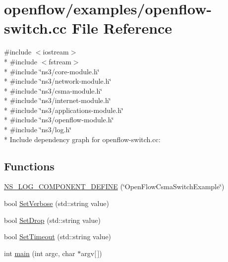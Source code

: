 \hypertarget{openflow-switch_8cc}{}\section{openflow/examples/openflow-\/switch.cc File Reference}
\label{openflow-switch_8cc}
{\ttfamily \#include $<$iostream$>$}\\*
{\ttfamily \#include $<$fstream$>$}\\*
{\ttfamily \#include \char`\"{}ns3/core-\/module.\+h\char`\"{}}\\*
{\ttfamily \#include \char`\"{}ns3/network-\/module.\+h\char`\"{}}\\*
{\ttfamily \#include \char`\"{}ns3/csma-\/module.\+h\char`\"{}}\\*
{\ttfamily \#include \char`\"{}ns3/internet-\/module.\+h\char`\"{}}\\*
{\ttfamily \#include \char`\"{}ns3/applications-\/module.\+h\char`\"{}}\\*
{\ttfamily \#include \char`\"{}ns3/openflow-\/module.\+h\char`\"{}}\\*
{\ttfamily \#include \char`\"{}ns3/log.\+h\char`\"{}}\\*
Include dependency graph for openflow-\/switch.cc\+:
\subsection*{Functions}
\begin{DoxyCompactItemize}
\item 
\hyperlink{openflow-switch_8cc_aa571fd29120b9088cf218d1432d3aa63}{N\+S\+\_\+\+L\+O\+G\+\_\+\+C\+O\+M\+P\+O\+N\+E\+N\+T\+\_\+\+D\+E\+F\+I\+NE} (\char`\"{}Open\+Flow\+Csma\+Switch\+Example\char`\"{})
\item 
bool \hyperlink{openflow-switch_8cc_aabb01f1253262daf5b9d12bcf26eafa7}{Set\+Verbose} (std\+::string value)
\item 
bool \hyperlink{openflow-switch_8cc_a39c23c06091b2372b665c9bafd7992a3}{Set\+Drop} (std\+::string value)
\item 
bool \hyperlink{openflow-switch_8cc_a8a605e661c7465f5be2e79bbce12032d}{Set\+Timeout} (std\+::string value)
\item 
int \hyperlink{openflow-switch_8cc_a0ddf1224851353fc92bfbff6f499fa97}{main} (int argc, char $\ast$argv\mbox{[}$\,$\mbox{]})
\end{DoxyCompactItemize}
